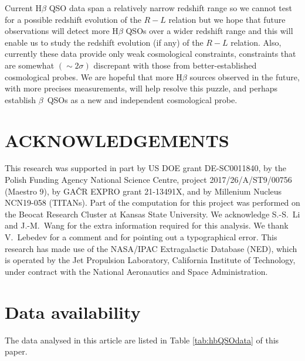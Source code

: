 \documentclass[a4paper,fleqn,usenatbib]{mnras}
\newcommand{\hb}{{\sc{H}}$\beta$\/}
\begin{document}
Current H$\beta$ QSO data span a relatively narrow redshift range so we cannot test for a possible redshift evolution of the $R-L$ relation but we hope that future observations will detect more H$\beta$ QSOs over a wider redshift range and this will enable us to study the redshift evolution (if any) of the $R-L$ relation. Also, currently these data provide only weak cosmological constraints, constraints that are somewhat {\boldmath$(\sim 2\sigma)$} discrepant with those from better-established cosmological probes. We are hopeful that more H$\beta$ sources observed in the future, with more precises measurements, will help resolve this puzzle, and perhaps establish \hb\ QSOs as a new and independent cosmological probe.

\section{ACKNOWLEDGEMENTS}

This research was supported in part by US DOE grant DE-SC0011840, by the Polish Funding Agency National Science Centre, project 2017/26/A/ST9/00756 (Maestro 9), by GAČR EXPRO grant 21-13491X, and by Millenium Nucleus NCN19-058 (TITANs). Part of the computation for this project was performed on the Beocat Research Cluster at Kansas State University. We acknowledge S.-S.\ Li and J.-M.\ Wang for the extra information required for this analysis. We thank V.\ Lebedev for a comment and for pointing out a typographical error. This research has made use of the NASA/IPAC Extragalactic Database (NED), which is operated by the Jet Propulsion Laboratory, California Institute of Technology, under contract with the National Aeronautics and Space Administration.

\section*{Data availability}
The data analysed in this article are listed in Table \ref{tab:hbQSOdata} of this paper.







\end{document}
